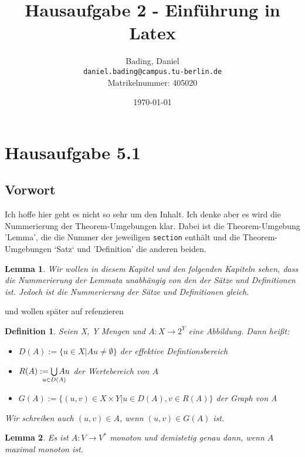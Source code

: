 \documentclass[a4paper]{article}
\title{Hausaufgabe 2 - Einführung in Latex}
\author{
  Bading, Daniel\\
  \texttt{daniel.bading@campus.tu-berlin.de}\\
  Matrikelnummer: 405020
  }
\date{\today}
\newcommand{\V}{V^{\ast}}
\newtheorem{lemma}{Lemma}[section]
\newtheorem{definition}[satz]{Definition}
\begin{document}
\maketitle

\newpage

\tableofcontents

\newpage


\section{Hausaufgabe 5.1}
\subsection{Vorwort}
Ich hoffe hier geht es nicht so sehr um den Inhalt. Ich denke aber es wird die Nummerierung der Theorem-Umgebungen klar. Dabei ist die Theorem-Umgebung 'Lemma', die die Nummer der jeweiligen \texttt{section} enthält und die Theorem-Umgebungen `Satz` und 'Definition' die anderen beiden. 
\begin{lemma}
Wir wollen in diesem Kapitel und den folgenden Kapiteln sehen, dass die Nummerierung der Lemmata unabhängig von den der Sätze und Definitionen ist. Jedoch ist die Nummerierung der Sätze und Definitionen gleich. 
\end{lemma}
%
und wollen später auf  refenzieren 
\begin{definition} 
Seien X, Y Mengen und $ A \colon X \to 2^Y $ eine Abbildung. Dann heißt:
\begin{itemize}
\item[i)] $ D(A)  := \{u \in X \vert Au \neq \emptyset \} $ der effektive Defintionsbereich
\item[ii)] $ R(A)  := \bigcup\limits_{\mathclap{u \in D(A)}}^{} Au $ der Wertebereich von $A$
\item[iii)] $ G(A)  := \{ ( u,v ) \in X \times Y \vert u \in D(A), v \in R(A) \} $ der Graph von A 
\end{itemize}
Wir schreiben auch $ (u,v) \in A$, wenn $ (u,v) \in G(A)$ ist.
\end{definition}
\begin{lemma}
Es ist $A: V \to \V $ monoton und demistetig genau dann, wenn $A$ maximal monoton ist. 
\end{lemma} 
\end{document}
